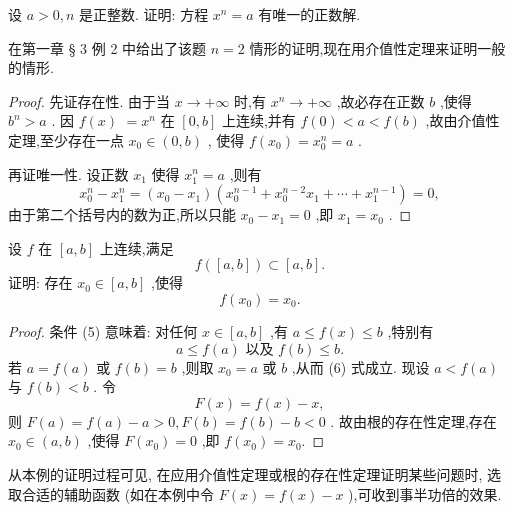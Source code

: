 \begin{example}
设 \(a > 0,n\) 是正整数. 证明: 方程 \({x}^{n} = a\) 有唯一的正数解.
\end{example}


在第一章 § 3 例 2 中给出了该题 \(n = 2\) 情形的证明,现在用介值性定理来证明一般的情形.

\begin{proof}
先证存在性. 由于当 \(x \rightarrow   + \infty\) 时,有 \({x}^{n} \rightarrow   + \infty\) ,故必存在正数 \(b\) ,使得 \({b}^{n} > a\) . 因 \(f\left( x\right)\)  \(= {x}^{n}\) 在 \(\left\lbrack  {0,b}\right\rbrack\) 上连续,并有 \(f\left( 0\right)  < a < f\left( b\right)\) ,故由介值性定理,至少存在一点 \({x}_{0} \in  \left( {0,b}\right)\) , 使得 \(f\left( {x}_{0}\right)  = {x}_{0}^{n} = a\) .

再证唯一性. 设正数 \({x}_{1}\) 使得 \({x}_{1}^{n} = a\) ,则有
\[
{x}_{0}^{n} - {x}_{1}^{n} = \left( {{x}_{0} - {x}_{1}}\right) \left( {{x}_{0}^{n - 1} + {x}_{0}^{n - 2}{x}_{1} + \cdots  + {x}_{1}^{n - 1}}\right)  = 0,
\]
由于第二个括号内的数为正,所以只能 \({x}_{0} - {x}_{1} = 0\) ,即 \({x}_{1} = {x}_{0}\) .
\end{proof}


\begin{example}
设 \(f\) 在 \(\left\lbrack  {a,b}\right\rbrack\) 上连续,满足
\[
f\left( \left\lbrack  {a,b}\right\rbrack  \right)  \subset  \left\lbrack  {a,b}\right\rbrack  . \tag{5}
\]
证明: 存在 \({x}_{0} \in  \left\lbrack  {a,b}\right\rbrack\) ,使得
\[
f\left( {x}_{0}\right)  = {x}_{0}. \tag{6}
\]
\end{example}

\begin{proof}
条件 (5) 意味着: 对任何 \(x \in  \left\lbrack  {a,b}\right\rbrack\) ,有 \(a \leq  f\left( x\right)  \leq  b\) ,特别有
\[
a \leq  f\left( a\right) \text{ 以及 }f\left( b\right)  \leq  b.
\]
若 \(a = f\left( a\right)\) 或 \(f\left( b\right)  = b\) ,则取 \({x}_{0} = a\) 或 \(b\) ,从而 (6) 式成立. 现设 \(a < f\left( a\right)\) 与 \(f\left( b\right)  < b\) . 令
\[
F\left( x\right)  = f\left( x\right)  - x,
\]
则 \(F\left( a\right)  = f\left( a\right)  - a > 0,F\left( b\right)  = f\left( b\right)  - b < 0\) . 故由根的存在性定理,存在 \({x}_{0} \in  \left( {a,b}\right)\) ,使得 \(F\left( {x}_{0}\right)  = 0\) ,即 \(f\left( {x}_{0}\right)  = {x}_{0}.\)
\end{proof}


从本例的证明过程可见, 在应用介值性定理或根的存在性定理证明某些问题时, 选取合适的辅助函数 (如在本例中令 \(F\left( x\right)  = f\left( x\right)  - x\) ),可收到事半功倍的效果.

